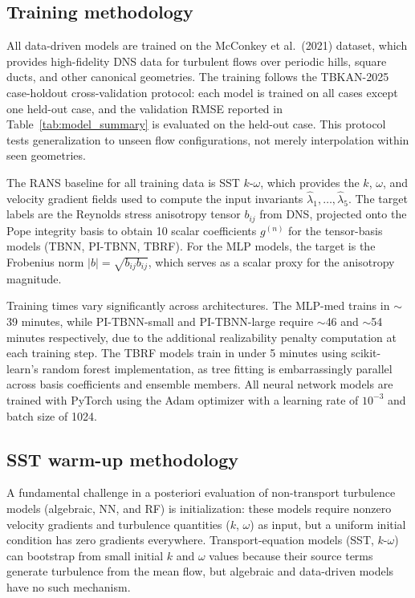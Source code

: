 \subsection{Training methodology}
\label{sec:training}

All data-driven models are trained on the McConkey et al.\ (2021) dataset, which provides high-fidelity DNS data for turbulent flows over periodic hills, square ducts, and other canonical geometries.
The training follows the TBKAN-2025 case-holdout cross-validation protocol: each model is trained on all cases except one held-out case, and the validation RMSE reported in Table~\ref{tab:model_summary} is evaluated on the held-out case.
This protocol tests generalization to unseen flow configurations, not merely interpolation within seen geometries.

The RANS baseline for all training data is SST $k$-$\omega$, which provides the $k$, $\omega$, and velocity gradient fields used to compute the input invariants $\hat{\lambda}_1, \ldots, \hat{\lambda}_5$.
The target labels are the Reynolds stress anisotropy tensor $b_{ij}$ from DNS, projected onto the Pope integrity basis to obtain 10 scalar coefficients $g^{(n)}$ for the tensor-basis models (TBNN, PI-TBNN, TBRF).
For the MLP models, the target is the Frobenius norm $|b| = \sqrt{b_{ij} b_{ij}}$, which serves as a scalar proxy for the anisotropy magnitude.

Training times vary significantly across architectures.
The MLP-med trains in $\sim$39 minutes, while PI-TBNN-small and PI-TBNN-large require $\sim$46 and $\sim$54 minutes respectively, due to the additional realizability penalty computation at each training step.
The TBRF models train in under 5 minutes using scikit-learn's random forest implementation, as tree fitting is embarrassingly parallel across basis coefficients and ensemble members.
All neural network models are trained with PyTorch using the Adam optimizer with a learning rate of $10^{-3}$ and batch size of 1024.

\subsection{SST warm-up methodology}
\label{sec:warmup}

A fundamental challenge in a posteriori evaluation of non-transport turbulence models (algebraic, NN, and RF) is initialization: these models require nonzero velocity gradients and turbulence quantities ($k$, $\omega$) as input, but a uniform initial condition has zero gradients everywhere.
Transport-equation models (SST, $k$-$\omega$) can bootstrap from small initial $k$ and $\omega$ values because their source terms generate turbulence from the mean flow, but algebraic and data-driven models have no such mechanism.

